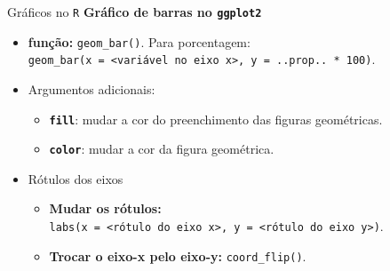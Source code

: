 \documentclass[
  10pt,
  ignorenonframetext,
]{beamer}
\providecommand{\tightlist}{%
  \setlength{\itemsep}{0pt}\setlength{\parskip}{0pt}}
\begin{document}
\begin{frame}[fragile]{Gráficos no \texttt{R}}
\protect\hypertarget{gruxe1ficos-no-r-2}{}
\textbf{Gráfico de barras no \texttt{ggplot2}}

\begin{itemize}
\tightlist
\item
  \textbf{função:} \texttt{geom\_bar()}. Para porcentagem:
  \texttt{geom\_bar(x\ =\ \textless{}variável\ no\ eixo\ x\textgreater{},\ y\ =\ ..prop..\ *\ 100)}.
\item
  Argumentos adicionais:

  \begin{itemize}
  \tightlist
  \item
    \textbf{\texttt{fill}}: mudar a cor do preenchimento das figuras
    geométricas.
  \item
    \textbf{\texttt{color}}: mudar a cor da figura geométrica.
  \end{itemize}
\item
  Rótulos dos eixos

  \begin{itemize}
  \tightlist
  \item
    \textbf{Mudar os rótulos:}
    \texttt{labs(x\ =\ \textless{}rótulo\ do\ eixo\ x\textgreater{},\ y\ =\ \textless{}rótulo\ do\ eixo\ y\textgreater{})}.
  \item
    \textbf{Trocar o eixo-x pelo eixo-y:} \texttt{coord\_flip()}.
  \end{itemize}
\end{itemize}
\end{frame}
\end{document}
